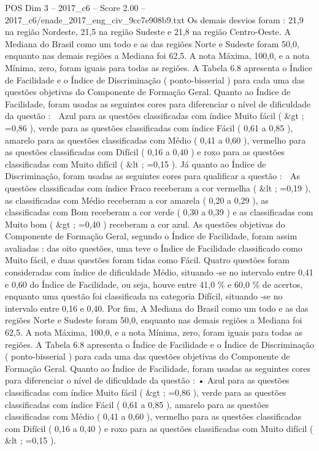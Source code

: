 \begin{textsample}{POS Dim 3 – 2017\_c6 – Score 2.00 – 2017\_c6/enade\_2017\_eng\_civ\_9cc7e908b9.txt}
Os demais desvios foram : 21,9 na região Nordeste, 21,5 na região Sudeste e 21,8 na região Centro-Oeste.
A Mediana do Brasil como um todo e as das regiões Norte e Sudeste foram 50,0, enquanto nas demais regiões a Mediana foi 62,5.
A nota Máxima, 100,0, e a nota Mínima, zero, foram iguais para todas as regiões.
A Tabela 6.8 apresenta o Índice de Facilidade e o Índice de Discriminação ( ponto-bisserial ) para cada uma das questões objetivas do Componente de Formação Geral.
Quanto ao Índice de Facilidade, foram usadas as seguintes cores para diferenciar o nível de dificuldade da questão :  Azul para as questões classificadas com índice Muito fácil ( \&gt ; =0,86 ), verde para as questões classificadas com índice Fácil ( 0,61 a 0,85 ), amarelo para as questões classificadas com Médio ( 0,41 a 0,60 ), vermelho para as questões classificadas com Difícil ( 0,16 a 0,40 ) e roxo para as questões classificadas com Muito difícil ( \&lt ; =0,15 ).
Já quanto ao Índice de Discriminação, foram usadas as seguintes cores para qualificar a questão :  As questões classificadas com índice Fraco receberam a cor vermelha ( \&lt ; =0,19 ), as classificadas com Médio receberam a cor amarela ( 0,20 a 0,29 ), as classificadas com Bom receberam a cor verde ( 0,30 a 0,39 ) e as classificadas com Muito bom ( \&gt ; =0,40 ) receberam a cor azul.
As questões objetivas do Componente de Formação Geral, segundo o Índice de Facilidade, foram assim avaliadas : das oito questões, uma teve o Índice de Facilidade classificado como Muito fácil, e duas questões foram tidas como Fácil.
Quatro questões foram consideradas com índice de dificuldade Médio, situando -se no intervalo entre 0,41 e 0,60 do Índice de Facilidade, ou seja, houve entre 41,0 \% e 60,0 \% de acertos, enquanto uma questão foi classificada na categoria Difícil, situando -se no intervalo entre 0,16 e 0,40.
Por fim, A Mediana do Brasil como um todo e as das regiões Norte e Sudeste foram 50,0, enquanto nas demais regiões a Mediana foi 62,5.
A nota Máxima, 100,0, e a nota Mínima, zero, foram iguais para todas as regiões.
A Tabela 6.8 apresenta o Índice de Facilidade e o Índice de Discriminação ( ponto-bisserial ) para cada uma das questões objetivas do Componente de Formação Geral.
Quanto ao Índice de Facilidade, foram usadas as seguintes cores para diferenciar o nível de dificuldade da questão : • Azul para as questões classificadas com índice Muito fácil ( \&gt ; =0,86 ), verde para as questões classificadas com índice Fácil ( 0,61 a 0,85 ), amarelo para as questões classificadas com Médio ( 0,41 a 0,60 ), vermelho para as questões classificadas com Difícil ( 0,16 a 0,40 ) e roxo para as questões classificadas com Muito difícil ( \&lt ; =0,15 ).

\end{textsample}
